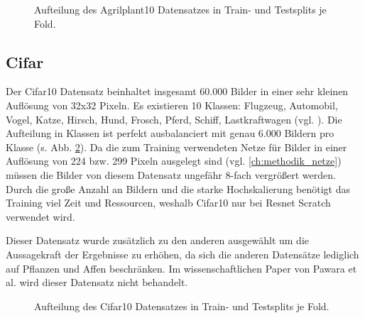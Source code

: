 \begin{figure}[H]
\begin{adjustbox}{width=1.4\textwidth, center}

\end{adjustbox}
\caption{Aufteilung des Agrilplant10 Datensatzes \cite{pawaraWebsiteDatensaetze} in Train- und Testsplits je Fold.}
\label{fig:Agrilplant10Zusammensetzung}
\end{figure}


\subsection{Cifar}
Der Cifar10 Datensatz beinhaltet insgesamt 60.000 Bilder in einer sehr kleinen Auflösung von 32x32 Pixeln. Es existieren 10 Klassen: Flugzeug, Automobil, Vogel, Katze, Hirsch, Hund, Frosch, Pferd, Schiff, Lastkraftwagen (vgl. \cite{cifar10}).
Die Aufteilung in Klassen ist perfekt ausbalanciert mit genau 6.000 Bildern pro Klasse (s. Abb. \ref{fig:Cifar10Zusammensetzung}).
Da die zum Training verwendeten Netze für Bilder in einer Auflösung von 224 bzw. 299 Pixeln ausgelegt sind (vgl. \ref{ch:methodik_netze}) müssen die Bilder von diesem Datensatz ungefähr 8-fach vergrößert werden.\\

Durch die große Anzahl an Bildern und die starke Hochskalierung benötigt das Training viel Zeit und Ressourcen, weshalb Cifar10 nur bei Resnet Scratch verwendet wird.

Dieser Datensatz wurde zusätzlich zu den anderen ausgewählt um die Aussagekraft der Ergebnisse zu erhöhen, da sich die anderen Datensätze lediglich auf Pflanzen und Affen beschränken. Im wissenschaftlichen Paper von Pawara et al. \cite{pawaraPaper} wird dieser Datensatz nicht behandelt.

\begin{figure}[H]
\begin{adjustbox}{width=1.4\textwidth, center}

\end{adjustbox}
\caption{Aufteilung des Cifar10 Datensatzes \cite{cifar10} in Train- und Testsplits je Fold.}
\label{fig:Cifar10Zusammensetzung}
\end{figure}


